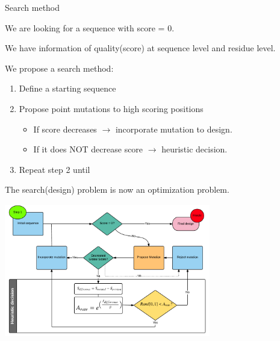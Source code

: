 \documentclass{beamer}
\begin{document}
\begin{frame}{Search method}

We are looking for a sequence with score = 0.
\pause

We have information of quality(score) at sequence level and residue level.

\pause
We propose a search method: 
\begin{enumerate}
 \item Define a starting sequence 
 \item Propose point mutations to high scoring positions
      \begin{itemize}
      \item If score decreases $\rightarrow$ incorporate mutation to design.
      \item If it does NOT decrease score $\rightarrow$ heuristic decision.
     \end{itemize}
 \item Repeat step 2 until 

\end{enumerate}

\pause
The search(design) problem is now an optimization problem.


\end{frame}




\begin{frame}
\vspace{-0.5\baselineskip}
\begin{adjustwidth}{-1.5em}{-2.5em}
\includegraphics[width=340px,height=220px]{../img/patena2.png} 
\end{adjustwidth}
\end{frame}
\end{document}
